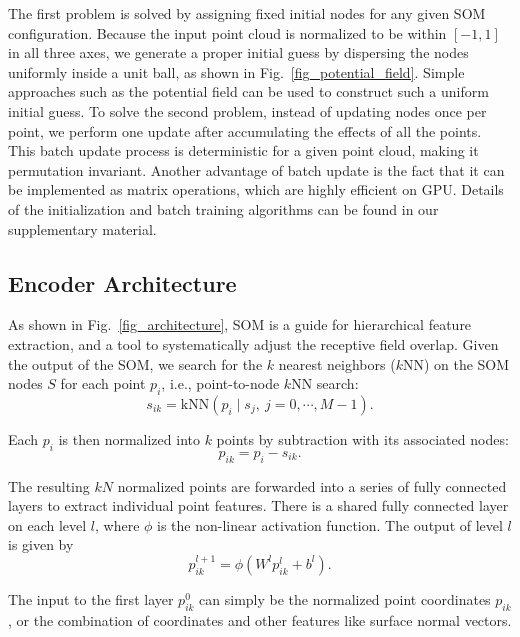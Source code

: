 \documentclass[10pt,twocolumn,letterpaper]{article}
\begin{document}
The first problem is solved by assigning fixed initial nodes for any given SOM configuration. Because the input point cloud is normalized to be within $[-1,1]$ in all three axes, we generate a proper initial guess by dispersing the nodes uniformly inside a unit ball, as shown in Fig.~\ref{fig_potential_field}. Simple approaches such as the potential field can be used to construct such a uniform initial guess. To solve the second problem, instead of updating nodes once per point, we perform one update after accumulating the effects of all the points. This batch update process is deterministic \cite{kohonen1998self} for a given point cloud, making it permutation invariant. Another advantage of batch update is the fact that it can be implemented as matrix operations, which are highly efficient on GPU. Details of the initialization and batch training algorithms can be found in our supplementary material.

\subsection{Encoder Architecture} \label{sec_encoder}
%
As shown in Fig.~\ref{fig_architecture}, SOM is a guide for hierarchical feature extraction, and a tool to systematically adjust the receptive field overlap. Given the output of the SOM, we search for the $k$ nearest neighbors ($k$NN) on the SOM nodes $S$ for each point $p_i$, i.e., point-to-node $k$NN search:
\begin{equation}
s_{ik} = \text{kNN}(p_i \mid s_j,~j = 0, \cdots, M-1).
\end{equation}

\noindent Each $p_i$ is then normalized into $k$ points by subtraction with its associated nodes:
\begin{equation} \label{equ_pik}
    p_{ik} = p_i - s_{ik}.
\end{equation}

\noindent The resulting $kN$ normalized points are forwarded into a series of fully connected layers to extract individual point features. There is a shared fully connected layer on each level $l$, where $\phi$ is the non-linear activation function. The output of level $l$ is given by
\begin{equation} \label{equ_fc}
    p_{ik}^{l+1} = \phi(W^l p_{ik}^l + b^l).
\end{equation}

\noindent The input to the first layer $p_{ik}^0$ can simply be the normalized point coordinates $p_{ik}$, or the combination of coordinates and other features like surface normal vectors.
\end{document}
